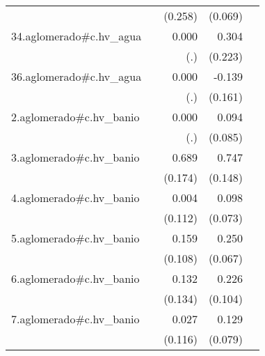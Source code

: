 {\begin{longtable}{l*{4}{D{.}{.}{-1}}}
            &                     &     (0.258)         &     (0.069)         &                     \\
\addlinespace
34.aglomerado#c.hv\_agua&                     &       0.000         &       0.304         &                     \\
            &                     &         (.)         &     (0.223)         &                     \\
\addlinespace
36.aglomerado#c.hv\_agua&                     &       0.000         &      -0.139         &                     \\
            &                     &         (.)         &     (0.161)         &                     \\
\addlinespace
2.aglomerado#c.hv\_banio&                     &       0.000         &       0.094         &                     \\
            &                     &         (.)         &     (0.085)         &                     \\
\addlinespace
3.aglomerado#c.hv\_banio&                     &       0.689\sym{***}&       0.747\sym{***}&                     \\
            &                     &     (0.174)         &     (0.148)         &                     \\
\addlinespace
4.aglomerado#c.hv\_banio&                     &       0.004         &       0.098         &                     \\
            &                     &     (0.112)         &     (0.073)         &                     \\
\addlinespace
5.aglomerado#c.hv\_banio&                     &       0.159         &       0.250\sym{***}&                     \\
            &                     &     (0.108)         &     (0.067)         &                     \\
\addlinespace
6.aglomerado#c.hv\_banio&                     &       0.132         &       0.226\sym{*}  &                     \\
            &                     &     (0.134)         &     (0.104)         &                     \\
\addlinespace
7.aglomerado#c.hv\_banio&                     &       0.027         &       0.129         &                     \\
            &                     &     (0.116)         &     (0.079)         &                     \\

\end{longtable}}

